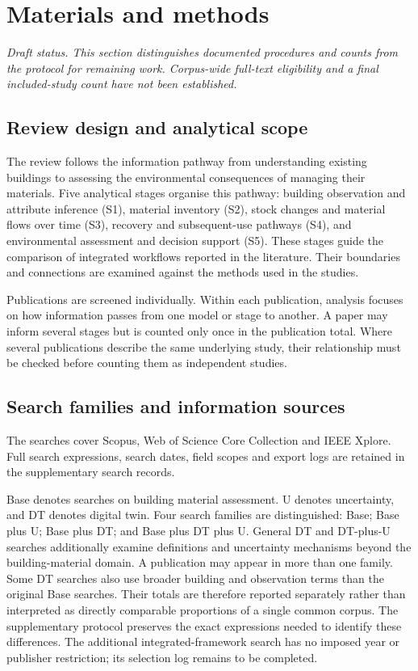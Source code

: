 \section{Materials and methods}
\noindent\textit{Draft status. This section distinguishes documented procedures and counts from the protocol for remaining work. Corpus-wide full-text eligibility and a final included-study count have not been established.}

\subsection{Review design and analytical scope}
The review follows the information pathway from understanding existing buildings to assessing the environmental consequences of managing their materials. Five analytical stages organise this pathway: building observation and attribute inference (S1), material inventory (S2), stock changes and material flows over time (S3), recovery and subsequent-use pathways (S4), and environmental assessment and decision support (S5). These stages guide the comparison of integrated workflows reported in the literature. Their boundaries and connections are examined against the methods used in the studies.

Publications are screened individually. Within each publication, analysis focuses on how information passes from one model or stage to another. A paper may inform several stages but is counted only once in the publication total. Where several publications describe the same underlying study, their relationship must be checked before counting them as independent studies.

\subsection{Search families and information sources}
The searches cover Scopus, Web of Science Core Collection and IEEE Xplore. Full search expressions, search dates, field scopes and export logs are retained in the supplementary search records.

Base denotes searches on building material assessment. U denotes uncertainty, and DT denotes digital twin. Four search families are distinguished: Base; Base plus U; Base plus DT; and Base plus DT plus U. General DT and DT-plus-U searches additionally examine definitions and uncertainty mechanisms beyond the building-material domain. A publication may appear in more than one family. Some DT searches also use broader building and observation terms than the original Base searches. Their totals are therefore reported separately rather than interpreted as directly comparable proportions of a single common corpus. The supplementary protocol preserves the exact expressions needed to identify these differences. The additional integrated-framework search has no imposed year or publisher restriction; its selection log remains to be completed.

